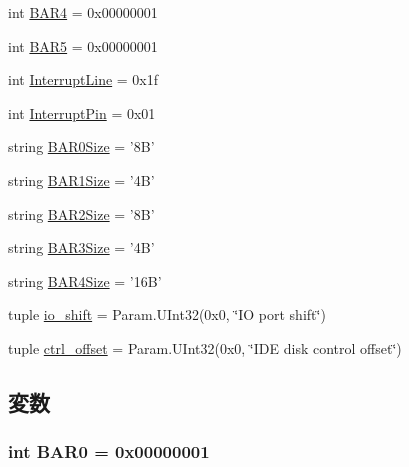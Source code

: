 \begin{DoxyCompactItemize}
\item 
int \hyperlink{classIde_1_1IdeController_a563ca469426838df82cc266c302a0a70}{BAR4} = 0x00000001
\item 
int \hyperlink{classIde_1_1IdeController_af86e51daee4f9d86104270e5ed9a0890}{BAR5} = 0x00000001
\item 
int \hyperlink{classIde_1_1IdeController_a4c885b3ef4f7d1a88903aabcce7a943e}{InterruptLine} = 0x1f
\item 
int \hyperlink{classIde_1_1IdeController_a9b18e7e4ee8e0f835496c9106eb519d5}{InterruptPin} = 0x01
\item 
string \hyperlink{classIde_1_1IdeController_aefc407ca01c833e5dac341709110c5e2}{BAR0Size} = '8B'
\item 
string \hyperlink{classIde_1_1IdeController_afc69d648d33db96d14379bec42eb512e}{BAR1Size} = '4B'
\item 
string \hyperlink{classIde_1_1IdeController_a7bf5305f5245e3120d4ed8431b3d9706}{BAR2Size} = '8B'
\item 
string \hyperlink{classIde_1_1IdeController_ab4d963f74d5c8e1d6915a406f94a094b}{BAR3Size} = '4B'
\item 
string \hyperlink{classIde_1_1IdeController_a41bfe3a2d21d011756368941585cc33f}{BAR4Size} = '16B'
\item 
tuple \hyperlink{classIde_1_1IdeController_a70540016105bd47dacafa00f2930da88}{io\_\-shift} = Param.UInt32(0x0, \char`\"{}IO port shift\char`\"{})
\item 
tuple \hyperlink{classIde_1_1IdeController_a598dd831b8f2ed1ab2858254aaa137e9}{ctrl\_\-offset} = Param.UInt32(0x0, \char`\"{}IDE disk control offset\char`\"{})
\end{DoxyCompactItemize}


\subsection{変数}
\hypertarget{classIde_1_1IdeController_aa4b1656989a2151c14fc1d464df6531c}{
\subsubsection[{BAR0}]{\setlength{\rightskip}{0pt plus 5cm}int {\bf BAR0} = 0x00000001}}
\label{classIde_1_1IdeController_aa4b1656989a2151c14fc1d464df6531c}



